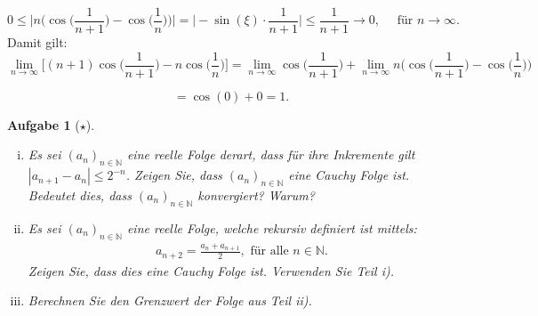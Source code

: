 \documentclass[a4paper, 20]{exam}
\newtheorem{ex}{Aufgabe}
\begin{document}
\begin{solution}
\begin{enumerate}[i.)]
$$0\leq \bigg\vert n\bigg( \cos\Big(\frac{1}{n+1}\Big) - \cos\Big(\frac{1}{n}\Big) \bigg) \bigg\vert
= \bigg\vert -\sin(\xi) \cdot \frac{1}{n+1} \bigg\vert 
\leq  \frac{1}{n+1} \longrightarrow 0, \quad \text{ f\"ur } n\longrightarrow \infty.$$
Damit gilt:
$$ \lim_{n \rightarrow \infty} \bigg[ (n+1) \cos\bigg( \frac{1}{n+1} \bigg) - n \cos\bigg( \frac{1}{n} \bigg) \bigg] 
=  \lim_{n \rightarrow \infty} \cos\Big(\frac{1}{n+1}\Big) + \lim_{n \rightarrow \infty}  n\bigg( \cos\Big(\frac{1}{n+1}\Big) - \cos\Big(\frac{1}{n}\Big) \bigg)$$

$$= \cos(0) +0 = 1.$$
\end{enumerate}
\end{solution}

\begin{ex}[$\star$] \
\begin{enumerate}[i)]
\item Es sei $(a_n)_{n \in \mathbb{N}}$ eine reelle Folge derart, dass für ihre Inkremente gilt $|a_{n+1}-a_n| \leq 2^{-n}$. Zeigen Sie, dass $(a_n)_{n \in \mathbb{N}}$ eine Cauchy Folge ist. Bedeutet dies, dass $(a_n)_{n \in \mathbb{N}}$ konvergiert? Warum? 
\item Es sei $(a_n)_{n \in \mathbb{N}}$ eine reelle Folge, welche rekursiv definiert ist mittels: 
\begin{align*}
a_{n+2} = \frac{a_n+a_{n+1}}{2}, \text{ für alle } n \in \mathbb{N}.
\end{align*}
Zeigen Sie, dass dies eine Cauchy Folge ist. Verwenden Sie Teil i). 
\item Berechnen Sie den Grenzwert der Folge aus Teil ii).
\end{enumerate}

\end{ex}
\end{document}
